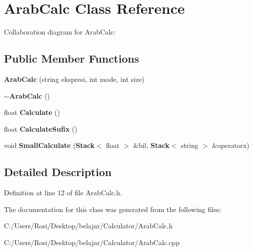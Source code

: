 \section{Arab\-Calc Class Reference}
\label{class_arab_calc}
Collaboration diagram for Arab\-Calc:\subsection*{Public Member Functions}
\begin{CompactItemize}
\item 
{\bf Arab\-Calc} (string ekspresi, int mode, int size)\label{class_arab_calc_b8753fcf7122ff1c02af495cd391ec04}

\item 
{\bf $\sim$Arab\-Calc} ()\label{class_arab_calc_3f083162c86a86c8f5039f4c1e033e4e}

\item 
float {\bf Calculate} ()\label{class_arab_calc_ef3b608a0cfab3929e1afe02afe9e580}

\item 
float {\bf Calculate\-Sufix} ()\label{class_arab_calc_bef31d5dcaf6b2f26dc145c04d823cd8}

\item 
void {\bf Small\-Calculate} ({\bf Stack}$<$ float $>$ \&bil, {\bf Stack}$<$ string $>$ \&operatorx)\label{class_arab_calc_39d423c5d2e7a2c63c57b26c42a65915}

\end{CompactItemize}


\subsection{Detailed Description}




Definition at line 12 of file Arab\-Calc.h.

The documentation for this class was generated from the following files:\begin{CompactItemize}
\item 
C:/Users/Rosi/Desktop/belajar/Calculator/Arab\-Calc.h\item 
C:/Users/Rosi/Desktop/belajar/Calculator/Arab\-Calc.cpp\end{CompactItemize}
